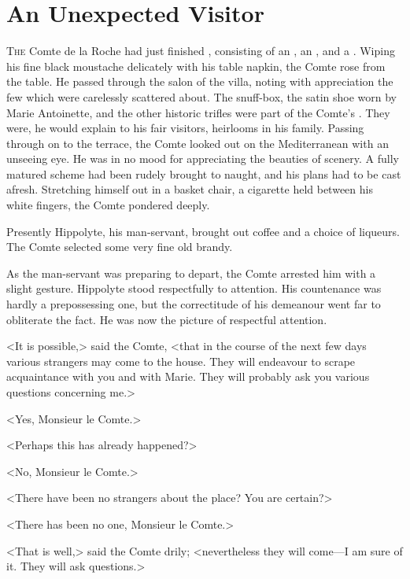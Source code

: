 \chapter{An Unexpected Visitor}



\lettrine{T}{he} Comte de la Roche had just finished , consisting of an , an , and a . Wiping his fine black moustache delicately with his table napkin, the Comte rose from the table. He passed through the salon of the villa, noting with appreciation the few  which were carelessly scattered about. The  snuff-box, the satin shoe worn by Marie Antoinette, and the other historic trifles were part of the Comte's . They were, he would explain to his fair visitors, heirlooms in his family. Passing through on to the terrace, the Comte looked out on the Mediterranean with an unseeing eye. He was in no mood for appreciating the beauties of scenery. A fully matured scheme had been rudely brought to naught, and his plans had to be cast afresh. Stretching himself out in a basket chair, a cigarette held between his white fingers, the Comte pondered deeply.

Presently Hippolyte, his man-servant, brought out coffee and a choice of liqueurs. The Comte selected some very fine old brandy.

As the man-servant was preparing to depart, the Comte arrested him with a slight gesture. Hippolyte stood respectfully to attention. His countenance was hardly a prepossessing one, but the correctitude of his demeanour went far to obliterate the fact. He was now the picture of respectful attention.

<It is possible,> said the Comte, <that in the course of the next few days various strangers may come to the house. They will endeavour to scrape acquaintance with you and with Marie. They will probably ask you various questions concerning me.>

<Yes, Monsieur le Comte.>

<Perhaps this has already happened?>

<No, Monsieur le Comte.>

<There have been no strangers about the place? You are certain?>

<There has been no one, Monsieur le Comte.>

<That is well,> said the Comte drily; <nevertheless they will come—I am sure of it. They will ask questions.>

